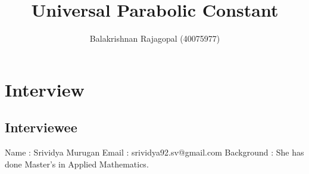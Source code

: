 \documentclass{report}
\title{Universal Parabolic Constant}
\author{Balakrishnan Rajagopal (40075977) }
\date{}
\begin{document}
\maketitle
\chapter{Interview}



\section{Interviewee}
\newline Name    : Srividya Murugan
\newline Email : srividya92.sv@gmail.com
\newline Background : She has done Master's in Applied Mathematics.

\newenvironment{qanda}{\setlength{\parindent}{0pt}}{\bigskip}
\newcommand{\Q}{\bigskip\bfseries Q: }
\newcommand{\A}{\par\textbf{A:} \normalfont}
 
\end{document}
